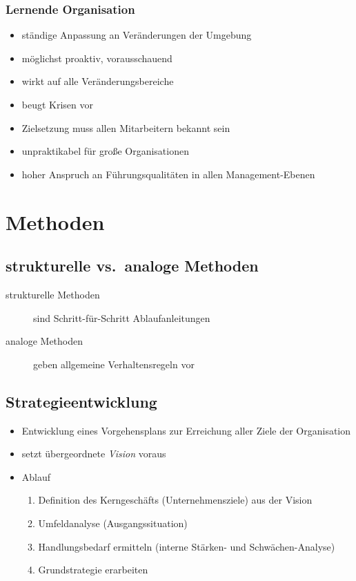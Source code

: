 \documentclass[a4paper, 12pt]{article}
\begin{document}
\subsubsection{Lernende Organisation}
\begin{itemize}
  \item ständige Anpassung an Veränderungen der Umgebung
  \item möglichst proaktiv, vorausschauend
  \item wirkt auf alle Veränderungsbereiche
\end{itemize}
\begin{itemize}
  \renewcommand{\labelitemi}{+}%
  \item beugt Krisen vor
\end{itemize}
\begin{itemize}
  \renewcommand{\labelitemi}{\(-\)}%
  \item Zielsetzung muss allen Mitarbeitern bekannt sein
  \item unpraktikabel für große Organisationen
  \item hoher Anspruch an Führungsqualitäten in allen Management-Ebenen
\end{itemize}



\section{Methoden}


\subsection{strukturelle vs.\ analoge Methoden}
\begin{description}
  \item[strukturelle Methoden] sind Schritt-für-Schritt Ablaufanleitungen
  \item[analoge Methoden] geben allgemeine Verhaltensregeln vor
\end{description}


\subsection{Strategieentwicklung}
\begin{itemize}
  \item Entwicklung eines Vorgehensplans zur Erreichung aller Ziele der Organisation
  \item setzt übergeordnete \emph{Vision} voraus
  \item Ablauf
    \begin{enumerate}
      \item Definition des Kerngeschäfts (Unternehmensziele) aus der Vision
      \item Umfeldanalyse (Ausgangssituation)
      \item Handlungsbedarf ermitteln (interne Stärken- und Schwächen-Analyse)
      \item Grundstrategie erarbeiten
    \end{enumerate}
\end{itemize}
\end{document}
